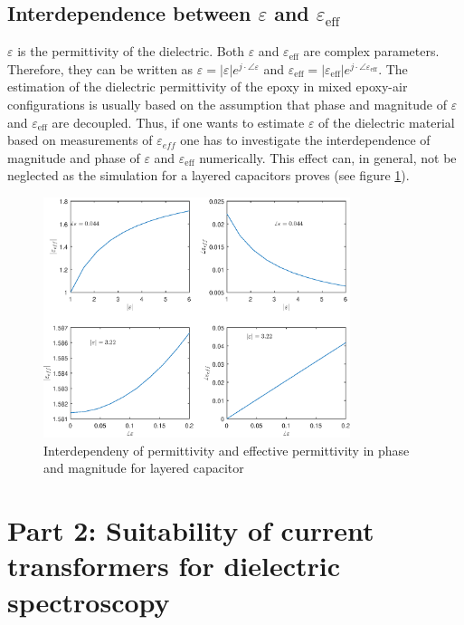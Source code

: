 \subsection{Interdependence between $\varepsilon$ and $\varepsilon_{\textrm{eff}}$} 
$\varepsilon$ is the permittivity of the dielectric. Both $\varepsilon$ and $\varepsilon_{\textrm{eff}}$ are complex parameters. Therefore, they can be written as $\varepsilon = |\varepsilon| e^{j \cdot \angle \varepsilon} $ and $\varepsilon_{\textrm{eff}} = |\varepsilon_{\textrm{eff}}| e^{j \cdot \angle \varepsilon_{\textrm{eff}}} $.	
The estimation of the dielectric permittivity of the epoxy in mixed epoxy-air configurations is usually based on the assumption that phase and magnitude of $\varepsilon$ and $\varepsilon_{\textrm{eff}}$ are decoupled. Thus, if one wants to estimate $\varepsilon$ of the dielectric material based on measurements of $\varepsilon_{eff}$ one has to investigate the interdependence of magnitude and phase of $\varepsilon$ and $\varepsilon_{\textrm{eff}}$ numerically. This effect can, in general, not be neglected as the simulation for a layered capacitors proves (see figure \ref{fig.layered}).  
\begin{figure}

	\includegraphics[width=0.8\textwidth]{figures/Theory/layereddielectrics.eps}
	\caption[Kurze Abbildungsbeschreibung]{Interdependeny of permittivity and effective permittivity in phase and magnitude for layered capacitor}
	\label{fig.layered}
\end{figure}
	
	
\section{Part 2: Suitability of current transformers for dielectric spectroscopy}
